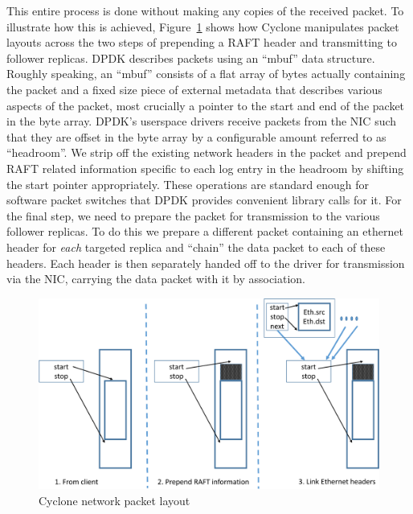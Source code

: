 \documentclass[pageno]{jpaper}
\begin{document}
This entire process is done without making any copies of the received packet.
To illustrate how this is achieved, Figure~\ref{fig:packet_layout} shows how
Cyclone manipulates packet
layouts across the two steps of prepending a RAFT header and transmitting to
follower replicas. DPDK describes packets using an ``mbuf'' data
structure. Roughly speaking, an ``mbuf'' consists of a flat array of bytes
actually containing the packet and a fixed size piece of external metadata that
describes various aspects of the packet, most crucially a pointer to the start
and end of the packet in the byte array. DPDK's userspace drivers receive
packets from the NIC such that they are offset in the byte array by a
configurable amount referred to as ``headroom''. We strip off the existing
network headers in the packet and prepend RAFT related information specific to
each log entry in the headroom by shifting the start pointer appropriately.
These operations are standard enough for software packet switches that DPDK
provides convenient library calls for it. For the final step, we need to prepare
the packet for transmission to the various follower replicas. To do this we
prepare a different packet containing an ethernet header for \emph{each}
targeted replica and ``chain'' the data packet to each of these headers. Each
header is then separately handed off to the driver for transmission via the NIC,
carrying the data packet with it by association.

\begin{figure}
  \centering
  \includegraphics[scale=0.35]{figures2/network_packet.pdf}
  \caption{Cyclone network packet layout}
  \label{fig:packet_layout}
\end{figure}
\end{document}
